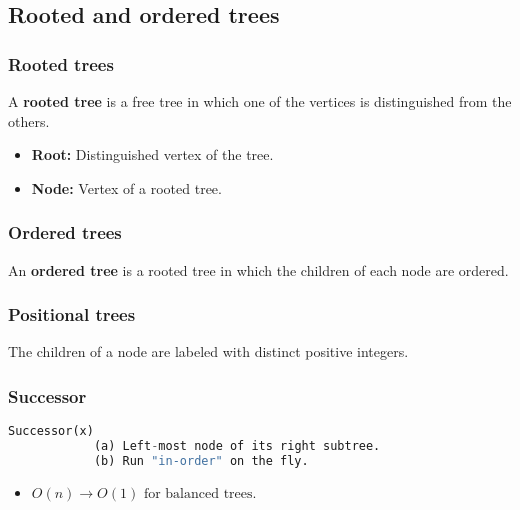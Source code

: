 \subsection{Rooted and ordered trees}
    \subsubsection{Rooted trees}
    \begin{definition}
        A \textbf{rooted tree} is a free tree in which one of the vertices is distinguished from the others.
        \begin{itemize}
            \item \textbf{Root:} Distinguished vertex of the tree.
            \item \textbf{Node:} Vertex of a rooted tree.
        \end{itemize}
    \end{definition}
    
    \subsubsection{Ordered trees}
    \begin{definition}
        An \textbf{ordered tree} is a rooted tree in which the children of each node are ordered.
    \end{definition}


    \subsubsection{Positional trees}
    \begin{definition}
        The children of a node are labeled with distinct positive integers.
    \end{definition}



\subsubsection{Successor}
\begin{definition}
    \begin{lstlisting}[language=Python, caption={Successor}]
        Successor(x)
            (a) Left-most node of its right subtree.
            (b) Run "in-order" on the fly.
    \end{lstlisting}

    \begin{itemize}
        \item $O(n) \rightarrow O(1) \text{ for balanced trees}.$
    \end{itemize}
\end{definition}